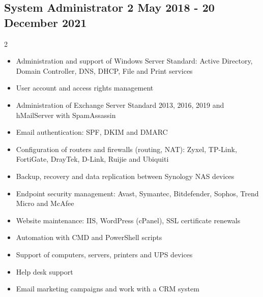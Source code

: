 \documentclass[a4paper, 10pt]{article}
\begin{document}
	\subsection*{System Administrator \hfill \normalsize 2 May 2018 - 20 December 2021}
	\begin{multicols}{2}
		\raggedright
		\begin{itemize}
		\item Administration and support of Windows Server Standard: Active Directory, Domain Controller, DNS, DHCP, File and Print services
		
		\item User account and access rights management
		
		\item Administration of Exchange Server Standard 2013, 2016, 2019 and hMailServer with SpamAssassin
		
		\item Email authentication: SPF, DKIM and DMARC
		
		\item Configuration of routers and firewalls (routing, NAT): Zyxel, TP-Link, FortiGate, DrayTek, D-Link, Ruijie and Ubiquiti
		
		\item Backup, recovery and data replication between Synology NAS devices
		
		\item Endpoint security management: Avast, Symantec, Bitdefender, Sophos, Trend Micro and McAfee
		
		\item Website maintenance: IIS, WordPress (cPanel), SSL certificate renewals
		
		\item Automation with CMD and PowerShell scripts
		
		\item Support of computers, servers, printers and UPS devices
		
		\item Help desk support
		
		\item Email marketing campaigns and work with a CRM system
		\end{itemize}
	\end{multicols}
	
\iffalse %
	\newpage
\end{document}
